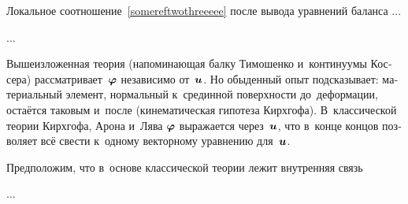 

\begin{otherlanguage}{russian}

Локальное соотношение~\eqref{somereftwothreeeee} после вывода уравнений баланса ...

...



\end{otherlanguage}



\begin{otherlanguage}{russian}

Вышеизложенная теория (напоминающая балку Тимошенко и~континуумы Коссера) рассматривает~$\bm{\varphi}$ независимо от~$\bm{u}$. Но обыденный опыт подсказывает: материальный элемент, нормальный к~срединной поверхности до~деформации, остаётся таковым и~после (кинематическая гипотеза Кирхгофа). В~классической теории Кирхгофа, Арона и~Лява $\bm{\varphi}$ выражается через~$\bm{u}$, что в~конце концов позволяет всё свести к~одному векторному уравнению для~$\bm{u}$.

Предположим, что в~основе классической теории лежит внутренняя связь

...



\end{otherlanguage}


